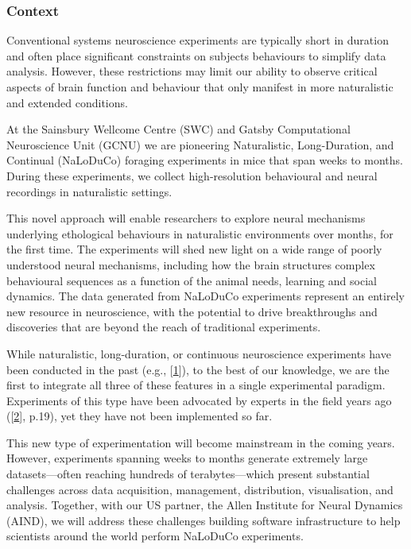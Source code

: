 \subsubsection{Context}

Conventional systems neuroscience experiments are typically short in duration
and often place significant constraints on subjects behaviours to simplify data
analysis.
%
However, these restrictions may limit our ability to observe critical
aspects of brain function and behaviour that only manifest in more naturalistic
and extended conditions.

At the Sainsbury Wellcome Centre (SWC) and Gatsby Computational Neuroscience
Unit (GCNU) we are pioneering Naturalistic, Long-Duration, and Continual
(NaLoDuCo) foraging experiments in mice that span weeks to months. During these
experiments, we collect high-resolution behavioural and neural recordings in
naturalistic settings.

This novel  approach will enable researchers to explore neural mechanisms
underlying ethological behaviours in naturalistic environments over months, for
the first time.  The experiments will shed new light on a wide range of poorly
understood neural mechanisms, including how the brain structures complex
behavioural sequences as a function of the animal needs, learning and social
dynamics.
%
The data generated from NaLoDuCo experiments represent an entirely new resource
in neuroscience, with the potential to drive breakthroughs and discoveries that
are beyond the reach of traditional experiments.

While naturalistic, long-duration, or continuous neuroscience experiments have
been conducted in the past (e.g.,
[\href{https://pubmed.ncbi.nlm.nih.gov/37656619/}{1}]), to the best of our
knowledge, we are the first to integrate all three of these features in a
single experimental paradigm.
%
Experiments of this type have been advocated by experts in the field years ago
([\href{https://pubmed.ncbi.nlm.nih.gov/31600508/}{2}], p.19), yet they have
not been implemented so far.

This new type of experimentation will become mainstream in the coming years.
%
However, experiments spanning weeks to months generate extremely large
datasets—often reaching hundreds of terabytes—which present substantial
challenges across data acquisition, management, distribution, visualisation,
and analysis.
%
Together, with our US partner, the Allen Institute for Neural Dynamics (AIND),
we will address these challenges building software infrastructure to help
scientists around the world perform NaLoDuCo experiments.

